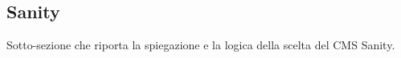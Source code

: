 \subsection{Sanity}

Sotto-sezione che riporta la spiegazione e la logica della scelta del CMS Sanity.